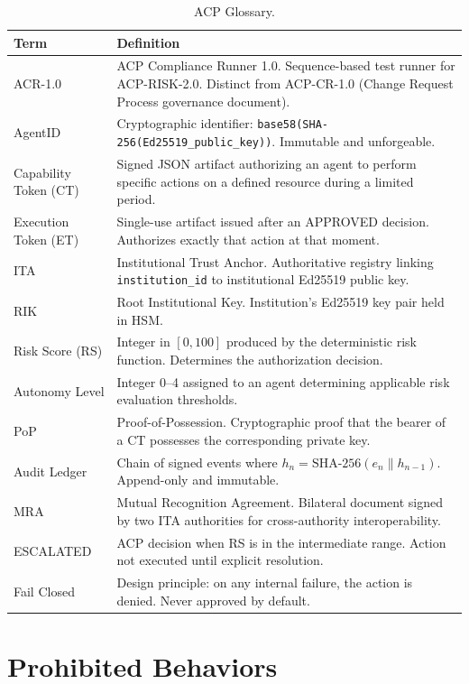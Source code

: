 \documentclass[11pt]{article}
\theoremstyle{definition}
\begin{document}
\begin{table}[h!]
\centering
\small
\begin{tabular}{@{}lp{10cm}@{}}
\toprule
\textbf{Term} & \textbf{Definition} \\
\midrule
ACR-1.0 & ACP Compliance Runner 1.0. Sequence-based test runner for ACP-RISK-2.0. Distinct from ACP-CR-1.0 (Change Request Process governance document). \\
AgentID & Cryptographic identifier: \texttt{base58(SHA-256(Ed25519\_public\_key))}. Immutable and unforgeable. \\
Capability Token (CT) & Signed JSON artifact authorizing an agent to perform specific actions on a defined resource during a limited period. \\
Execution Token (ET) & Single-use artifact issued after an APPROVED decision. Authorizes exactly that action at that moment. \\
ITA & Institutional Trust Anchor. Authoritative registry linking \texttt{institution\_id} to institutional Ed25519 public key. \\
RIK & Root Institutional Key. Institution's Ed25519 key pair held in HSM. \\
Risk Score (RS) & Integer in $[0, 100]$ produced by the deterministic risk function. Determines the authorization decision. \\
Autonomy Level & Integer 0--4 assigned to an agent determining applicable risk evaluation thresholds. \\
PoP & Proof-of-Possession. Cryptographic proof that the bearer of a CT possesses the corresponding private key. \\
Audit Ledger & Chain of signed events where $h_n = \text{SHA-256}(e_n \| h_{n-1})$. Append-only and immutable. \\
MRA & Mutual Recognition Agreement. Bilateral document signed by two ITA authorities for cross-authority interoperability. \\
ESCALATED & ACP decision when RS is in the intermediate range. Action not executed until explicit resolution. \\
Fail Closed & Design principle: on any internal failure, the action is denied. Never approved by default. \\
\bottomrule
\end{tabular}
\caption{ACP Glossary.}
\end{table}

\section{Prohibited Behaviors}
\label{app:prohib}
\end{document}
